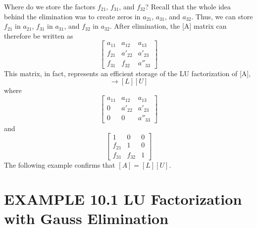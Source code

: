 \documentclass[../main.tex]{subfiles}
\begin{document}
Where do we store the factors $f_{21}$, $f_{31}$, and $f_{32}$? Recall that the whole idea behind the elimination was to create zeros in $a_{21}$, $a_{31}$, and $a_{32}$. Thus, we can store $f_{21}$ in $a_{21}$, $f_{31}$ in $a_{31}$, and $f_{32}$ in $a_{32}$. After elimination, the [A] matrix can therefore be written as
\begin{equation}
\begin{bmatrix}
a_{11} &a_{12}  &a_{13} \\
f_{21} &a'_{22}  &a'_{23} \\
f_{31} &f_{32}  &a''_{33}
\end{bmatrix}\tag{10.10}
\end{equation}
This matrix, in fact, represents an efficient storage of the LU factorization of [A],
\begin{equation}
[A]\rightarrow [L][U]\tag{10.11}
\end{equation}
where
\begin{equation}
\begin{bmatrix}
a_{11} &a_{12}  &a_{13} \\
0 &a'_{22}  &a'_{23} \\
0 &0  &a''_{33}
\end{bmatrix}\tag{10.12}
\end{equation}
and
\begin{equation}
\begin{bmatrix}
1 &0  &0 \\
f_{21} &1  &0 \\
f_{31} &f_{32}  &1
\end{bmatrix}\tag{10.13}
\end{equation}
The following example confirms that $[A]=[L][U]$.

\section*{EXAMPLE 10.1 LU Factorization with Gauss Elimination}
\end{document}
